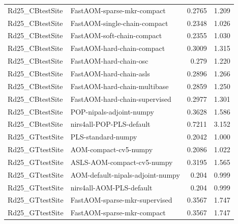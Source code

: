 \begin{landscape}
\begin{longtable}{L{8.0cm}L{9.5cm}rr}
Rd25\_\allowbreak{}CBtestSite & FastAOM-\allowbreak{}sparse-\allowbreak{}mkr-\allowbreak{}compact & 0.2765 & 1.209 \\
Rd25\_\allowbreak{}CBtestSite & FastAOM-\allowbreak{}single-\allowbreak{}chain-\allowbreak{}compact & 0.2348 & 1.026 \\
Rd25\_\allowbreak{}CBtestSite & FastAOM-\allowbreak{}soft-\allowbreak{}chain-\allowbreak{}compact & 0.2355 & 1.030 \\
Rd25\_\allowbreak{}CBtestSite & FastAOM-\allowbreak{}hard-\allowbreak{}chain-\allowbreak{}compact & 0.3009 & 1.315 \\
Rd25\_\allowbreak{}CBtestSite & FastAOM-\allowbreak{}hard-\allowbreak{}chain-\allowbreak{}osc & 0.279 & 1.220 \\
Rd25\_\allowbreak{}CBtestSite & FastAOM-\allowbreak{}hard-\allowbreak{}chain-\allowbreak{}asls & 0.2896 & 1.266 \\
Rd25\_\allowbreak{}CBtestSite & FastAOM-\allowbreak{}hard-\allowbreak{}chain-\allowbreak{}multibase & 0.2859 & 1.250 \\
Rd25\_\allowbreak{}CBtestSite & FastAOM-\allowbreak{}hard-\allowbreak{}chain-\allowbreak{}supervised & 0.2977 & 1.301 \\
Rd25\_\allowbreak{}CBtestSite & POP-\allowbreak{}nipals-\allowbreak{}adjoint-\allowbreak{}numpy & 0.3628 & 1.586 \\
Rd25\_\allowbreak{}CBtestSite & nirs4all-\allowbreak{}POP-\allowbreak{}PLS-\allowbreak{}default & 0.7211 & 3.152 \\
Rd25\_\allowbreak{}GTtestSite & PLS-\allowbreak{}standard-\allowbreak{}numpy & 0.2042 & 1.000 \\
Rd25\_\allowbreak{}GTtestSite & AOM-\allowbreak{}compact-\allowbreak{}cv5-\allowbreak{}numpy & 0.2086 & 1.022 \\
Rd25\_\allowbreak{}GTtestSite & ASLS-\allowbreak{}AOM-\allowbreak{}compact-\allowbreak{}cv5-\allowbreak{}numpy & 0.3195 & 1.565 \\
Rd25\_\allowbreak{}GTtestSite & AOM-\allowbreak{}default-\allowbreak{}nipals-\allowbreak{}adjoint-\allowbreak{}numpy & 0.204 & 0.999 \\
Rd25\_\allowbreak{}GTtestSite & nirs4all-\allowbreak{}AOM-\allowbreak{}PLS-\allowbreak{}default & 0.204 & 0.999 \\
Rd25\_\allowbreak{}GTtestSite & FastAOM-\allowbreak{}sparse-\allowbreak{}mkr-\allowbreak{}supervised & 0.3567 & 1.747 \\
Rd25\_\allowbreak{}GTtestSite & FastAOM-\allowbreak{}sparse-\allowbreak{}mkr-\allowbreak{}compact & 0.3567 & 1.747 \\

\end{longtable}
\end{landscape}
